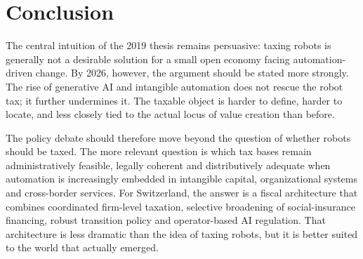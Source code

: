 \documentclass[11pt]{article}
\begin{document}
\section{Conclusion}
The central intuition of the 2019 thesis remains persuasive: taxing robots is generally not a desirable solution for a small open economy facing automation-driven change. By 2026, however, the argument should be stated more strongly. The rise of generative AI and intangible automation does not rescue the robot tax; it further undermines it. The taxable object is harder to define, harder to locate, and less closely tied to the actual locus of value creation than before.

The policy debate should therefore move beyond the question of whether robots should be taxed. The more relevant question is which tax bases remain administratively feasible, legally coherent and distributively adequate when automation is increasingly embedded in intangible capital, organizational systems and cross-border services. For Switzerland, the answer is a fiscal architecture that combines coordinated firm-level taxation, selective broadening of social-insurance financing, robust transition policy and operator-based AI regulation. That architecture is less dramatic than the idea of taxing robots, but it is better suited to the world that actually emerged.
\end{document}

